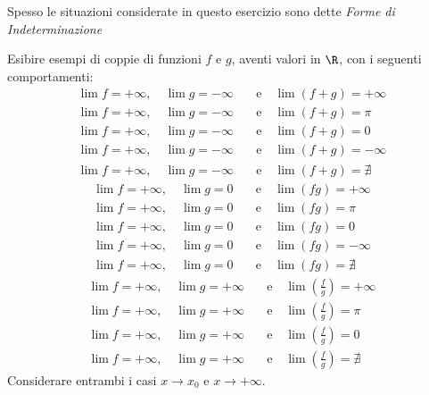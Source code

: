 \begin{samepage}
\begin{exercise}\label{ex:esmp_form_det}
	\leavevmode\vspace*{-\baselineskip}
	\begin{note}
		Spesso le situazioni considerate in questo esercizio sono dette \textit{Forme di Indeterminazione}
	\end{note}
	Esibire esempi di coppie di funzioni $f$ e $g$, aventi valori in $\R$, con i seguenti comportamenti:
	\begin{align*}
		\lim f = +\infty, \quad \lim g = -\infty \quad &\text{e} \quad \lim (f + g) = +\infty\\
		\lim f = +\infty, \quad \lim g = -\infty \quad &\text{e} \quad \lim (f + g) = \pi\\
		\lim f = +\infty, \quad \lim g = -\infty \quad &\text{e} \quad \lim (f + g) = 0\\
		\lim f = +\infty, \quad \lim g = -\infty \quad &\text{e} \quad \lim (f + g) = -\infty\\
		\lim f = +\infty, \quad \lim g = -\infty \quad &\text{e} \quad \lim (f + g) = \nexists
	\end{align*}
	\begin{align*}
		\lim f = +\infty, \quad \lim g = 0 \quad &\text{e} \quad \lim (fg) = +\infty\\
		\lim f = +\infty, \quad \lim g = 0 \quad &\text{e} \quad \lim (fg) = \pi\\
		\lim f = +\infty, \quad \lim g = 0 \quad &\text{e} \quad \lim (fg) = 0\\
		\lim f = +\infty, \quad \lim g = 0 \quad &\text{e} \quad \lim (fg) = -\infty\\
		\lim f = +\infty, \quad \lim g = 0 \quad &\text{e} \quad \lim (fg) = \nexists
	\end{align*}
	\begin{align*}
		\lim f = +\infty, \quad \lim g = +\infty \quad &\text{e} \quad \lim \left( \frac{f}{g} \right) = +\infty\\
		\lim f = +\infty, \quad \lim g = +\infty \quad &\text{e} \quad \lim \left( \frac{f}{g} \right) = \pi\\
		\lim f = +\infty, \quad \lim g = +\infty \quad &\text{e} \quad \lim \left( \frac{f}{g} \right) = 0\\
		\lim f = +\infty, \quad \lim g = +\infty \quad &\text{e} \quad \lim \left( \frac{f}{g} \right) = \nexists
	\end{align*}
	Considerare entrambi i casi $x \to x_0$ e $x \to +\infty$.
\end{exercise}
\end{samepage}
